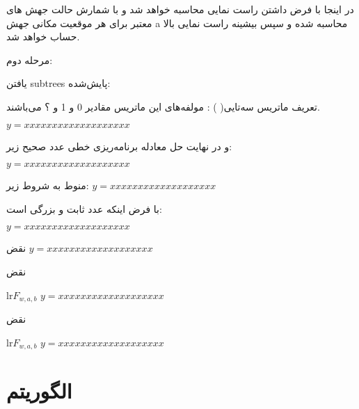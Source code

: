 در اینجا با فرض داشتن   راست نمایی محاسبه خواهد شد و    با شمارش حالت جهش های معتبر برای هر موقعیت مکانی جهش a محاسبه شده و سپس بیشینه راست نمایی بالا حساب خواهد شد. 

مرحله دوم:  

یافتن \gls{subtrees} پایش‌شده: 

تعریف ماتریس سه‌تایی( ) : مولفه‌های این ماتریس مقادیر 0 و 1 و ؟ می‌باشند.

\begin{math}
	y=xxxxxxxxxxxxxxxxxxx
\end{math}

و در نهایت حل معادله برنامه‌ریزی خطی عدد صحیح زیر: 

\begin{math}
	y=xxxxxxxxxxxxxxxxxxx
\end{math}


منوط به شروط زیر: 
\begin{math}
	y=xxxxxxxxxxxxxxxxxxx
\end{math}


با فرض اینکه  عدد ثابت و بزرگی است: 

\begin{math}
	y=xxxxxxxxxxxxxxxxxxx
\end{math}


نقض 
\begin{math}
	y=xxxxxxxxxxxxxxxxxxx
\end{math}


نقض 

lr{$F_{w,a,b}$}
\begin{math}
	y=xxxxxxxxxxxxxxxxxxx
\end{math}


نقض 

lr{$F_{w,a,b}$}
\begin{math}
	y=xxxxxxxxxxxxxxxxxxx
\end{math}


\section{الگوریتم   \cite{azer2020tumor}}

